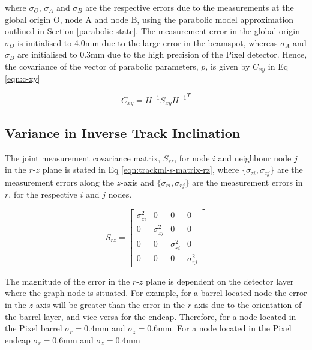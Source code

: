 where $\sigma_O$, $\sigma_A$ and $\sigma_B$ are the respective errors due to the measurements at the global origin O, node A and node B, using the parabolic model approximation outlined in Section \ref{parabolic-state}. The measurement error in the global origin $\sigma_O$ is initialised to 4.0mm due to the large error in the beamspot, whereas $\sigma_A$ and $\sigma_B$ are initialised to 0.3mm due to the high precision of the Pixel detector. Hence, the covariance of the vector of parabolic parameters, $p$, is given by $C_{xy}$ in Eq \eqref{eqn:c-xy}

\begin{equation}
    C_{xy} = H^{-1}S_{xy}{H^{-1}}^{T}
    \label{eqn:c-xy}
\end{equation}






\subsection{Variance in Inverse Track Inclination}

The joint measurement covariance matrix, $S_{rz}$, for node $i$ and neighbour node $j$ in the $r$-$z$ plane is stated in Eq \eqref{eqn:trackml-s-matrix-rz}, where $\{ \sigma_{zi}, \sigma_{zj} \}$ are the measurement errors along the $z$-axis and $\{ \sigma_{ri}, \sigma_{rj} \}$ are the measurement errors in $r$, for the respective $i$ and $j$ nodes. 

\begin{equation}
    S_{rz} = \begin{bmatrix} \sigma_{zi}^{2} & 0 & 0 & 0 \\ 
                             0 & \sigma_{zj}^{2} & 0 & 0 \\ 
                             0 & 0 & \sigma_{ri}^{2} & 0 \\
                             0 & 0 & 0 & \sigma_{rj}^{2}
                            \end{bmatrix} 
    \label{eqn:trackml-s-matrix-rz}
\end{equation}


The magnitude of the error in the $r$-$z$ plane is dependent on the detector layer where the graph node is situated. For example, for a barrel-located node the error in the $z$-axis will be greater than the error in the $r$-axis due to the orientation of the barrel layer, and vice versa for the endcap. Therefore, for a node located in the Pixel barrel $\sigma_r = 0.4$mm and $\sigma_z = 0.6$mm. For a node located in the Pixel endcap $\sigma_r = 0.6$mm and $\sigma_z = 0.4$mm

